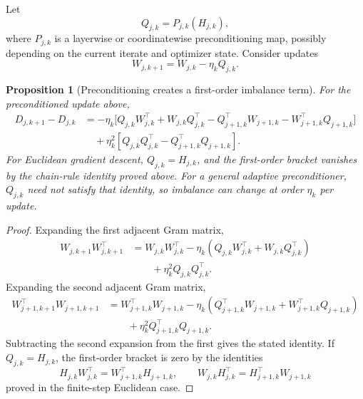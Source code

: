 \documentclass{article}
\newtheorem{proposition}{Proposition}
\begin{document}
Let
\[
    Q_{j,k}=P_{j,k}(H_{j,k}),
\]
where \(P_{j,k}\) is a layerwise or coordinatewise preconditioning map,
possibly depending on the current iterate and optimizer state.  Consider
updates
\[
    W_{j,k+1}
    =
    W_{j,k}
    -
    \eta_k Q_{j,k}.
\]

\begin{proposition}[Preconditioning creates a first-order imbalance term]
For the preconditioned update above,
\[
\begin{aligned}
    D_{j,k+1}-D_{j,k}
    &=
    -\eta_k
    \Big[
        Q_{j,k}W_{j,k}^\top
        +
        W_{j,k}Q_{j,k}^\top
        -
        Q_{j+1,k}^\top W_{j+1,k}
        -
        W_{j+1,k}^\top Q_{j+1,k}
    \Big] \\
    &\quad
    +
    \eta_k^2
    \left[
        Q_{j,k}Q_{j,k}^\top
        -
        Q_{j+1,k}^\top Q_{j+1,k}
    \right].
\end{aligned}
\]
For Euclidean gradient descent, \(Q_{j,k}=H_{j,k}\), and the first-order
bracket vanishes by the chain-rule identity proved above.  For a general
adaptive preconditioner, \(Q_{j,k}\) need not satisfy that identity, so
imbalance can change at order \(\eta_k\) per update.
\end{proposition}

\begin{proof}
Expanding the first adjacent Gram matrix,
\[
\begin{aligned}
    W_{j,k+1}W_{j,k+1}^\top
    &=
    W_{j,k}W_{j,k}^\top
    -
    \eta_k
    \left(
        Q_{j,k}W_{j,k}^\top
        +
        W_{j,k}Q_{j,k}^\top
    \right)  \\
    &\qquad
    +
    \eta_k^2Q_{j,k}Q_{j,k}^\top .
\end{aligned}
\]
Expanding the second adjacent Gram matrix,
\[
\begin{aligned}
    W_{j+1,k+1}^\top W_{j+1,k+1}
    &=
    W_{j+1,k}^\top W_{j+1,k}
    -
    \eta_k
    \left(
        Q_{j+1,k}^\top W_{j+1,k}
        +
        W_{j+1,k}^\top Q_{j+1,k}
    \right)  \\
    &\qquad
    +
    \eta_k^2Q_{j+1,k}^\top Q_{j+1,k}.
\end{aligned}
\]
Subtracting the second expansion from the first gives the stated
identity.  If \(Q_{j,k}=H_{j,k}\), the first-order bracket is zero by
the identities
\[
    H_{j,k}W_{j,k}^\top
    =
    W_{j+1,k}^\top H_{j+1,k},
    \qquad
    W_{j,k}H_{j,k}^\top
    =
    H_{j+1,k}^\top W_{j+1,k}
\]
proved in the finite-step Euclidean case.
\end{proof}
\end{document}
